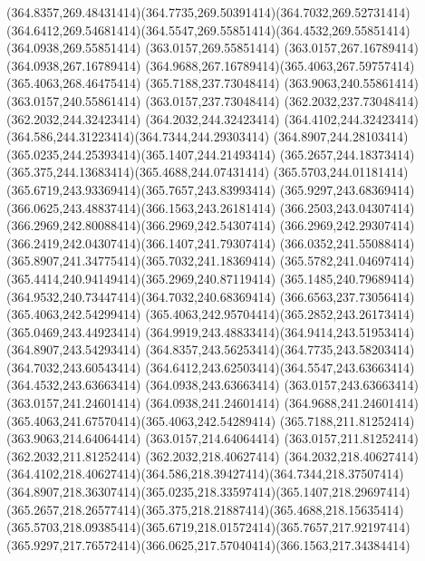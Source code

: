 {{	\curveto(364.8357,269.48431414)(364.7735,269.50391414)(364.7032,269.52731414)
	\curveto(364.6412,269.54681414)(364.5547,269.55851414)(364.4532,269.55851414)
	\lineto(364.0938,269.55851414)
	\lineto(363.0157,269.55851414)
	\lineto(363.0157,267.16789414)
	\lineto(364.0938,267.16789414)
	\curveto(364.9688,267.16789414)(365.4063,267.59757414)(365.4063,268.46475414)
	\closepath
	\moveto(365.7188,237.73048414)
	\lineto(363.9063,240.55861414)
	\lineto(363.0157,240.55861414)
	\lineto(363.0157,237.73048414)
	\lineto(362.2032,237.73048414)
	\lineto(362.2032,244.32423414)
	\lineto(364.2032,244.32423414)
	\curveto(364.4102,244.32423414)(364.586,244.31223414)(364.7344,244.29303414)
	\curveto(364.8907,244.28103414)(365.0235,244.25393414)(365.1407,244.21493414)
	\curveto(365.2657,244.18373414)(365.375,244.13683414)(365.4688,244.07431414)
	\curveto(365.5703,244.01181414)(365.6719,243.93369414)(365.7657,243.83993414)
	\curveto(365.9297,243.68369414)(366.0625,243.48837414)(366.1563,243.26181414)
	\curveto(366.2503,243.04307414)(366.2969,242.80088414)(366.2969,242.54307414)
	\curveto(366.2969,242.29307414)(366.2419,242.04307414)(366.1407,241.79307414)
	\curveto(366.0352,241.55088414)(365.8907,241.34775414)(365.7032,241.18369414)
	\curveto(365.5782,241.04697414)(365.4414,240.94149414)(365.2969,240.87119414)
	\curveto(365.1485,240.79689414)(364.9532,240.73447414)(364.7032,240.68369414)
	\lineto(366.6563,237.73056414)
	\closepath
	\moveto(365.4063,242.54299414)
	\curveto(365.4063,242.95704414)(365.2852,243.26173414)(365.0469,243.44923414)
	\curveto(364.9919,243.48833414)(364.9414,243.51953414)(364.8907,243.54293414)
	\curveto(364.8357,243.56253414)(364.7735,243.58203414)(364.7032,243.60543414)
	\curveto(364.6412,243.62503414)(364.5547,243.63663414)(364.4532,243.63663414)
	\lineto(364.0938,243.63663414)
	\lineto(363.0157,243.63663414)
	\lineto(363.0157,241.24601414)
	\lineto(364.0938,241.24601414)
	\curveto(364.9688,241.24601414)(365.4063,241.67570414)(365.4063,242.54289414)
	\closepath
	\moveto(365.7188,211.81252414)
	\lineto(363.9063,214.64064414)
	\lineto(363.0157,214.64064414)
	\lineto(363.0157,211.81252414)
	\lineto(362.2032,211.81252414)
	\lineto(362.2032,218.40627414)
	\lineto(364.2032,218.40627414)
	\curveto(364.4102,218.40627414)(364.586,218.39427414)(364.7344,218.37507414)
	\curveto(364.8907,218.36307414)(365.0235,218.33597414)(365.1407,218.29697414)
	\curveto(365.2657,218.26577414)(365.375,218.21887414)(365.4688,218.15635414)
	\curveto(365.5703,218.09385414)(365.6719,218.01572414)(365.7657,217.92197414)
	\curveto(365.9297,217.76572414)(366.0625,217.57040414)(366.1563,217.34384414)
}}

